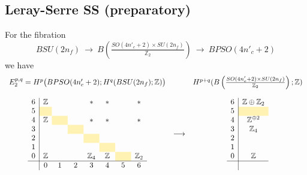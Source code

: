 \documentclass[12pt]{article}
\numberwithin{equation}{section}
\def\bZ{\mathbb{Z}}
\begin{document}
\subsection{Leray-Serre SS (preparatory)}
For the fibration
\begin{equation}
	BSU(2n_f)
	\ \to\ 
	B\left(\tfrac{SO(4n'_c+2)\times SU(2n_f)}{\bZ_2}\right)
	\ \to\ 
	BPSO(4n'_c+2)
\end{equation}
we have
\begin{equation}
	\begin{array}{ccc}
		E_2^{p,q}=H^p\big(BPSO(4n'_c+2);H^q(BSU(2n_f);\bZ)\big) && H^{p+q}(B\left(\tfrac{SO(4n'_c+2)\times SU(2n_f)}{\bZ_2}\right);\bZ)\vspace{4mm}\\
		\begin{array}{c|ccccccccccccc}
			6  & \bZ &&& \ast & \ast && \ast\\
			5  & \cellcolor{lightyellow} & \hphantom{\bZ_2} & \hphantom{\bZ_2} & \hphantom{\bZ_2} & \hphantom{\bZ_2} & \hphantom{\bZ_2} \\
			4  & \bZ & \cellcolor{lightyellow} && \ast & \ast & & \ast\\
			3  &  && \cellcolor{lightyellow} &&&\\
			2  &&  && \cellcolor{lightyellow} &&\\
			1  &  &&  && \cellcolor{lightyellow} &&\\
			0 & \bZ &  && \bZ_4 & \bZ & \cellcolor{lightyellow} & \bZ_2\\
			\hline
			& 0 & 1 & 2 & 3 & 4 & 5 & 6 \\
		\end{array}
		& \longrightarrow & 
		\begin{array}{c|c}
			6  & \bZ\oplus \bZ_2\\
			5  & \cellcolor{lightyellow}\\
			4  & \bZ^{\oplus 2}\\
			3  & \bZ_4\\
			2  & \\
			1  & \\
			0 & \bZ\\
			\hline\\
		\end{array}
	\end{array}
\end{equation}
\end{document}
